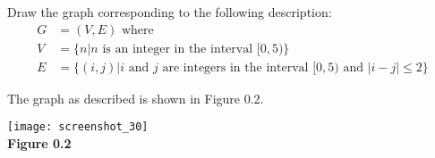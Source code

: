 \documentclass{article}
\begin{document}
Draw the graph corresponding to the following description:
\begin{align*}
G &= (V, E) \text{ where}\\
V &= \{ n | n \text{ is an integer in the interval } [0, 5)\}\\
E &= \{ (i,j) | i \text{ and } j \text{ are integers in the interval } [0, 5) \text{ and } 
|i-j| \leq 2\}
\end{align*}

The graph as described is shown in Figure 0.2.
\begin{center}
\texttt{[image: screenshot\_30]}\\
\textbf{Figure 0.2}
\end{center}
\end{document}
